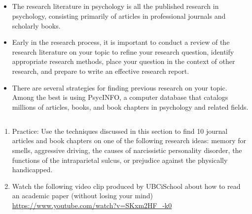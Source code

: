 \subsection{}
\begin{fullwidth}
\begin{itemize}
\item The research literature in psychology is all the published research in psychology, consisting primarily of articles in professional journals and scholarly books.
\item Early in the research process, it is important to conduct a review of the research literature on your topic to refine your research question, identify appropriate research methods, place your question in the context of other research, and prepare to write an effective research report.
\item There are several strategies for finding previous research on your topic. Among the best is using PsycINFO, a computer database that catalogs millions of articles, books, and book chapters in psychology and related fields.
\end{itemize}
\end{fullwidth}

\subsection{}
\begin{fullwidth}
\begin{enumerate}
\item Practice: Use the techniques discussed in this section to find 10 journal articles and book chapters on one of the following research ideas: memory for smells, aggressive driving, the causes of narcissistic personality disorder, the functions of the intraparietal sulcus, or prejudice against the physically handicapped.
\item Watch the following video clip produced by UBCiSchool about how to read an academic paper (without losing your mind) \url{https://www.youtube.com/watch?v=SKxm2HF_-k0}
\end{enumerate}
\end{fullwidth}  


